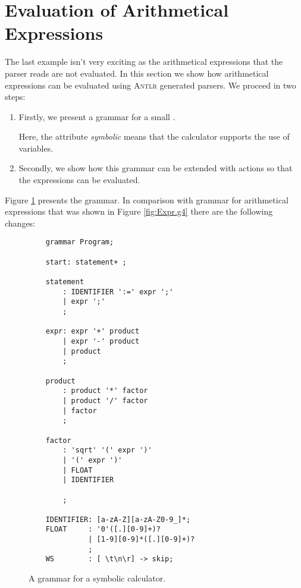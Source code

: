 \section{Evaluation of Arithmetical Expressions}
The last example isn't very exciting as the arithmetical expressions that the parser reads are not
evaluated.  In this section we show how arithmetical expressions can be evaluated using \textsc{Antlr}
generated parsers.  We proceed in two steps:
\begin{enumerate}
\item Firstly, we present a grammar for a small .

      Here, the attribute \emph{symbolic} means that the calculator supports the use of variables.
\item Secondly, we show how this grammar can be extended with actions so that the expressions can be evaluated.
\end{enumerate}
Figure \ref{fig:Program.g4} presents the grammar.  In comparison with grammar for arithmetical expressions that
was shown in Figure \ref{fig:Expr.g4} there are the following changes:

\begin{figure}[!ht]
\centering
\begin{verbatim}
    grammar Program;
    
    start: statement+ ; 
    
    statement
        : IDENTIFIER ':=' expr ';' 
        | expr ';'                 
        ;
    
    expr: expr '+' product 
        | expr '-' product 
        | product
        ;
    
    product 
        : product '*' factor 
        | product '/' factor 
        | factor
        ;
    
    factor
        : 'sqrt' '(' expr ')'
        | '(' expr ')'        
        | FLOAT               
        | IDENTIFIER          

        ;
    
    IDENTIFIER: [a-zA-Z][a-zA-Z0-9_]*;
    FLOAT     : '0'([.][0-9]+)?
              | [1-9][0-9]*([.][0-9]+)?
              ;
    WS        : [ \t\n\r] -> skip; 
\end{verbatim}
\vspace*{-0.3cm}
\caption{A grammar for a symbolic calculator.}
\label{fig:Program.g4}
\end{figure}


